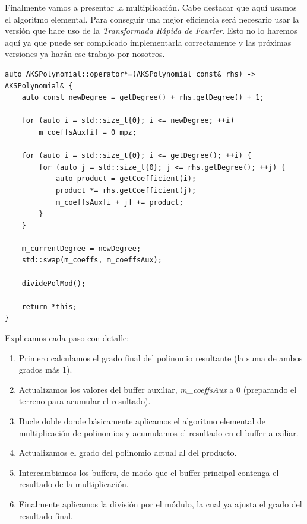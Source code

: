 Finalmente vamos a presentar la multiplicación. Cabe destacar que aquí usamos el algoritmo elemental. Para conseguir una mejor eficiencia será necesario usar la versión que hace uso de la \textit{Transformada Rápida de Fourier}. Esto no lo haremos aquí ya que puede ser complicado implementarla correctamente y las próximas versiones ya harán ese trabajo por nosotros.\\

\begin{lstlisting}
auto AKSPolynomial::operator*=(AKSPolynomial const& rhs) -> AKSPolynomial& {
	auto const newDegree = getDegree() + rhs.getDegree() + 1;
	
	for (auto i = std::size_t{0}; i <= newDegree; ++i)
		m_coeffsAux[i] = 0_mpz;
	
	for (auto i = std::size_t{0}; i <= getDegree(); ++i) {
		for (auto j = std::size_t{0}; j <= rhs.getDegree(); ++j) {
			auto product = getCoefficient(i);
			product *= rhs.getCoefficient(j);
			m_coeffsAux[i + j] += product;
		}
	}
	
	m_currentDegree = newDegree;
	std::swap(m_coeffs, m_coeffsAux);
	
	dividePolMod();
	
	return *this;
}
\end{lstlisting}

Explicamos cada paso con detalle:

\begin{enumerate}
	\item Primero calculamos el grado final del polinomio resultante (la suma de ambos grados más $1$).
	
	\item Actualizamos los valores del buffer auxiliar, \textit{m\_coeffsAux} a $0$ (preparando el terreno para acumular el resultado).
	
	\item Bucle doble donde básicamente aplicamos el algoritmo elemental de multiplicación de polinomios y acumulamos el resultado en el buffer auxiliar.
	
	\item Actualizamos el grado del polinomio actual al del producto.
	
	\item Intercambiamos los buffers, de modo que el buffer principal contenga el resultado de la multiplicación.
	
	\item Finalmente aplicamos la división por el módulo, la cual ya ajusta el grado del resultado final.
\end{enumerate}

